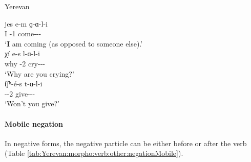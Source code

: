 \begin{exe}
	\ex Yerevan \label{sent:Yerevan:morpho:verb:other:irregImpfIs} \begin{xlist}
		\ex \gll jes e-m ɡ-ɑ-l-i \\
		I {\aux}-1{\sg} come-{\thgloss}-{\infgloss}-{\impfcvb} \\
		\trans `\textbf{I} am coming (as opposed to someone else).' \\
		\ex \gll χ\'i e-s l-ɑ-l-i \\
		why {\aux}-2{\sg} cry-{\thgloss}-{\infgloss}-{\impfcvb} \\
		\trans `Why are you crying?' \\
		\ex \gll t͡ʃʰ-\'e-s t-ɑ-l-i \\
		{\neggloss}-{\aux}-2{\sg} give-{\thgloss}-{\infgloss}-{\impfcvb} \\
		\trans `Won't you give?' \\
	\end{xlist} 
\end{exe}

\paragraph{Mobile negation}


In negative forms, the negative particle can be either before or after the verb (Table \ref{tab:Yerevan:morpho:verb:other:negationMobile}). 


